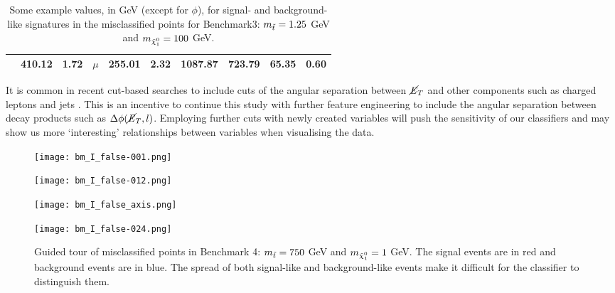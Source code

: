 \begin{table}[htbp]
\begin{tabular}{p{2.2cm}||c|c|c|c|c|c|c|c|c}
        & 410.12 & 1.72 & $\mu$ & 255.01 & 2.32 & 1087.87 & 723.79 & 65.35 & 0.60 \\
        \bottomrule
    \end{tabular}
    \caption{Some example values, in GeV (except for $\phi$), for signal- and background-like signatures in the misclassified points for Benchmark3: $m_{\Tilde{t}} = 1.25$ GeV and $m_{\Tilde{\chi}_1^0} = 100$ GeV.}
    \label{tab:ex_bm3}
\end{table}
\newpage

It is common in recent cut-based searches to include cuts of the angular separation between $\cancel{\it{E}}_{T}$ and other components such as charged leptons and jets \cite{kraml2016scalar, chatrchyan2013search}. This is an incentive to continue this study with further feature engineering to include the angular separation between decay products such as $\Delta \phi(\cancel{\it{E}}_{T},l)$. Employing further cuts with newly created variables will push the sensitivity of our classifiers and may show us more `interesting' relationships between variables when visualising the data. \\

\begin{figure}[htbp]
\centering
  \begin{minipage}[htbp]{0.4\textwidth}
    \centering
    \texttt{[image: bm\_I\_false-001.png]}
  \end{minipage}
  \begin{minipage}[htbp]{0.4\textwidth}
    \centering
    \texttt{[image: bm\_I\_false-012.png]}
  \end{minipage}
  \begin{minipage}[htbp]{0.4\textwidth}
    \centering
    \texttt{[image: bm\_I\_false\_axis.png]}
  \end{minipage}
  \begin{minipage}[htbp]{0.4\textwidth}
    \centering
    \texttt{[image: bm\_I\_false-024.png]}
  \end{minipage}
  \caption{Guided tour of misclassified points in Benchmark 4: $m_{\Tilde{t}} = 750$ GeV and $m_{\Tilde{\chi}_1^0} = 1$ GeV. The signal events are in red and background events are in blue. The spread of both signal-like and background-like events make it difficult for the classifier to distinguish them.}
  \label{fig:bmInF_tour}
\end{figure}

